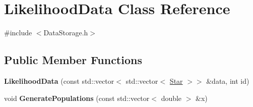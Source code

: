 \hypertarget{classLikelihoodData}{}\section{Likelihood\+Data Class Reference}
\label{classLikelihoodData}


{\ttfamily \#include $<$Data\+Storage.\+h$>$}

\subsection*{Public Member Functions}
\begin{DoxyCompactItemize}
\item 
\mbox{\label{classLikelihoodData_abe754db1273e8ed99a0bf08a26c13aad}} 
{\bfseries Likelihood\+Data} (const std\+::vector$<$ std\+::vector$<$ \hyperlink{classStar}{Star} $>$$>$ \&data, int id)
\item 
\mbox{\label{classLikelihoodData_a1911a871964da019810ac0342352ae8c}} 
void {\bfseries Generate\+Populations} (const std\+::vector$<$ double $>$ \&x)
\end{DoxyCompactItemize}
